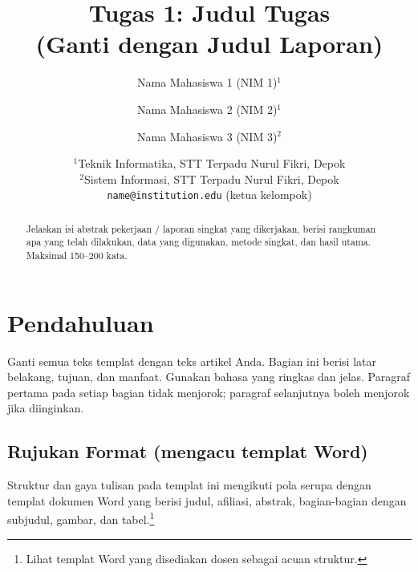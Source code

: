 \documentclass[11pt,a4paper]{article}
\title{\textbf{Tugas 1: Judul Tugas}\\ \large (Ganti dengan Judul Laporan)}
\author{%
Nama Mahasiswa 1 (NIM 1)$^{1}$ \and
Nama Mahasiswa 2 (NIM 2)$^{1}$ \and
Nama Mahasiswa 3 (NIM 3)$^{2}$}
\date{%
$^{1}$Teknik Informatika, STT Terpadu Nurul Fikri, Depok\\%
$^{2}$Sistem Informasi, STT Terpadu Nurul Fikri, Depok\\[4pt]
\texttt{name@institution.edu} (ketua kelompok)
}
\begin{document}
\maketitle
\onehalfspacing


\begin{abstract}
Jelaskan isi abstrak pekerjaan / laporan singkat yang dikerjakan, berisi rangkuman apa yang telah dilakukan, data yang digunakan, metode singkat, dan hasil utama. Maksimal 150--200 kata.
\end{abstract}

\section{Pendahuluan}
Ganti semua teks templat dengan teks artikel Anda. Bagian ini berisi latar belakang, tujuan, dan manfaat. Gunakan bahasa yang ringkas dan jelas. Paragraf pertama pada setiap bagian tidak menjorok; paragraf selanjutnya boleh menjorok jika diinginkan.

\subsection{Rujukan Format (mengacu templat Word)}
Struktur dan gaya tulisan pada templat ini mengikuti pola serupa dengan templat dokumen Word yang berisi judul, afiliasi, abstrak, bagian-bagian dengan subjudul, gambar, dan tabel.\footnote{Lihat templat Word yang disediakan dosen sebagai acuan struktur.}
\end{document}

